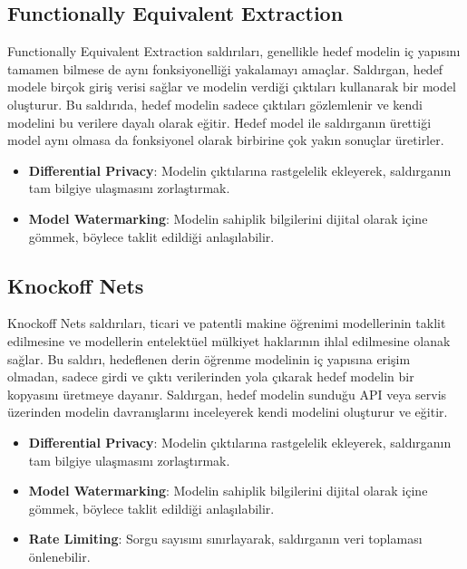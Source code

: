 \subsection{Functionally Equivalent Extraction}

Functionally Equivalent Extraction saldırıları, genellikle hedef modelin iç yapısını tamamen bilmese de aynı fonksiyonelliği yakalamayı amaçlar. Saldırgan, hedef modele birçok giriş verisi sağlar ve modelin verdiği çıktıları kullanarak bir model oluşturur. Bu saldırıda, hedef modelin sadece çıktıları gözlemlenir ve kendi modelini bu verilere dayalı olarak eğitir. Hedef model ile saldırganın ürettiği model aynı olmasa da fonksiyonel olarak birbirine çok yakın sonuçlar üretirler.

\begin{itemize}
    \item \textbf{Differential Privacy}: Modelin çıktılarına rastgelelik ekleyerek, saldırganın tam bilgiye ulaşmasını zorlaştırmak.
    \item \textbf{Model Watermarking}: Modelin sahiplik bilgilerini dijital olarak içine gömmek, böylece taklit edildiği anlaşılabilir.
\end{itemize}

\newpage

\subsection{Knockoff Nets}

Knockoff Nets saldırıları, ticari ve patentli makine öğrenimi modellerinin taklit edilmesine ve modellerin entelektüel mülkiyet haklarının ihlal edilmesine olanak sağlar. Bu saldırı, hedeflenen derin öğrenme modelinin iç yapısına erişim olmadan, sadece girdi ve çıktı verilerinden yola çıkarak hedef modelin bir kopyasını üretmeye dayanır. Saldırgan, hedef modelin sunduğu API veya servis üzerinden modelin davranışlarını inceleyerek kendi modelini oluşturur ve eğitir.

\begin{itemize}
    \item \textbf{Differential Privacy}: Modelin çıktılarına rastgelelik ekleyerek, saldırganın tam bilgiye ulaşmasını zorlaştırmak.
    \item \textbf{Model Watermarking}: Modelin sahiplik bilgilerini dijital olarak içine gömmek, böylece taklit edildiği anlaşılabilir.
    \item \textbf{Rate Limiting}: Sorgu sayısını sınırlayarak, saldırganın veri toplaması önlenebilir.
\end{itemize}

